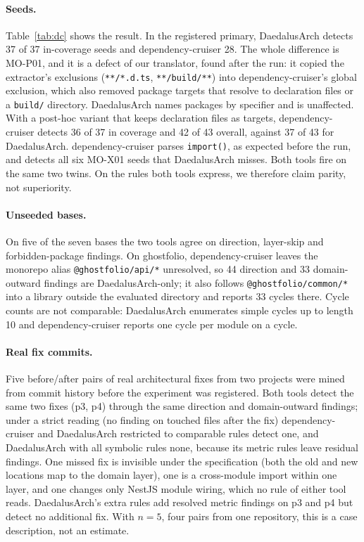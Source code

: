 \documentclass[10pt,a4paper]{article}
\newcommand{\tool}{DaedalusArch}
\newcommand{\dc}{dependency-cruiser}
\begin{document}
\paragraph{Seeds.}
Table~\ref{tab:dc} shows the result. In the registered primary, \tool{} detects 37 of 37 in-coverage seeds and
\dc{} 28. The whole difference is MO-P01, and it is a defect of our translator, found after the run: it copied the
extractor's exclusions (\texttt{**/*.d.ts}, \texttt{**/build/**}) into \dc{}'s global exclusion, which also removed
package targets that resolve to declaration files or a \texttt{build/} directory. \tool{} names packages by
specifier and is unaffected. With a post-hoc variant that keeps declaration files as targets, \dc{} detects 36 of 37
in coverage and 42 of 43 overall, against 37 of 43 for \tool{}. \dc{} parses \texttt{import()}, as expected before
the run, and detects all six MO-X01 seeds that \tool{} misses. Both tools fire on the same two twins.
On the rules both tools express, we therefore claim parity, not superiority.

\paragraph{Unseeded bases.}
On five of the seven bases the two tools agree on direction, layer-skip and forbidden-package findings. On ghostfolio,
\dc{} leaves the monorepo alias \texttt{@ghostfolio/api/*} unresolved, so 44 direction and 33 domain-outward findings
are \tool{}-only; it also follows \texttt{@ghostfolio/common/*} into a library outside the evaluated directory and
reports 33 cycles there. Cycle counts are not comparable: \tool{} enumerates simple cycles up to length 10 and \dc{}
reports one cycle per module on a cycle. %

\paragraph{Real fix commits.}
Five before/after pairs of real architectural fixes from two projects were mined from commit history before the
experiment was registered. Both tools detect the same two fixes (p3, p4) through the same direction and
domain-outward findings; under a strict reading (no finding on touched files after the fix) \dc{} and \tool{}
restricted to comparable rules detect one, and \tool{} with all symbolic rules none, because its metric rules leave
residual findings. One missed fix is invisible under the specification (both the old and new locations map to the
domain layer), one is a cross-module import within one layer, and one changes only NestJS module wiring, which no
rule of either tool reads. \tool{}'s extra rules add resolved metric findings on p3 and p4 but detect no additional
fix. With $n = 5$, four pairs from one repository, this is a case description, not an estimate.
\end{document}
